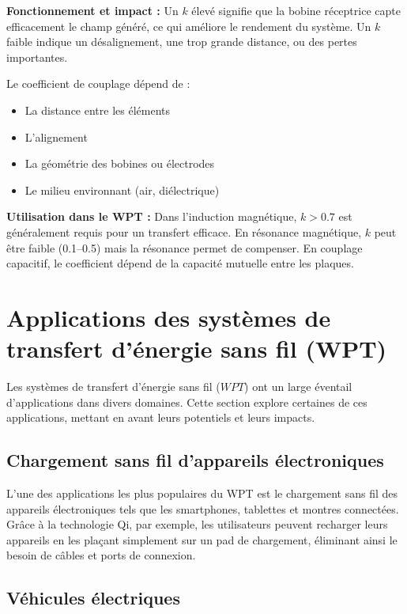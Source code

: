 \documentclass[12pt,a4paper,titlepage,notitlepage]{article}
\begin{document}
	\textbf{Fonctionnement et impact :} Un \(k\) élevé signifie que la bobine réceptrice capte efficacement le champ généré, ce qui améliore le rendement du système. Un \(k\) faible indique un désalignement, une trop grande distance, ou des pertes importantes.
	
	Le coefficient de couplage dépend de :
	\begin{itemize}
		\item La distance entre les éléments
		\item L’alignement
		\item La géométrie des bobines ou électrodes
		\item Le milieu environnant (air, diélectrique)
	\end{itemize}
	
	\textbf{Utilisation dans le WPT :} Dans l’induction magnétique, \(k > 0.7\) est généralement requis pour un transfert efficace. En résonance magnétique, \(k\) peut être faible (0.1–0.5) mais la résonance permet de compenser. En couplage capacitif, le coefficient dépend de la capacité mutuelle entre les plaques.
	
	
	
	
	
	
	
	
	
	\section{Applications des systèmes de transfert d'énergie sans fil (WPT)}
	
	Les systèmes de transfert d'énergie sans fil ($WPT$) ont un large éventail d'applications dans divers domaines. Cette section explore certaines de ces applications, mettant en avant leurs potentiels et leurs impacts.
	
	\subsection{Chargement sans fil d'appareils électroniques}
	
	L'une des applications les plus populaires du WPT est le chargement sans fil des appareils électroniques tels que les smartphones, tablettes et montres connectées. Grâce à la technologie Qi, par exemple, les utilisateurs peuvent recharger leurs appareils en les plaçant simplement sur un pad de chargement, éliminant ainsi le besoin de câbles et ports de connexion.
	
	\subsection{Véhicules électriques}
	
\end{document}
